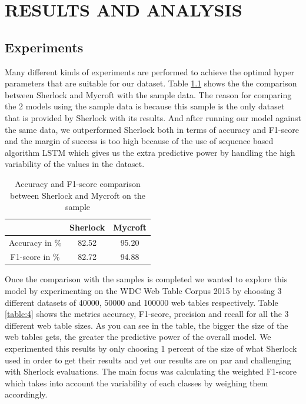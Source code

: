 \documentclass[12pt, a4paper]{report}
\theoremstyle{definition}
\numberwithin{equation}{chapter}
\numberwithin{figure}{chapter}
\numberwithin{table}{chapter}
\begin{document}
\chapter{RESULTS AND ANALYSIS}
\begin{spacing}{1.5}

\section*{Experiments}

Many different kinds of experiments are performed to achieve the optimal hyper parameters that are suitable for our dataset. Table \ref{table:3} shows the the comparison between Sherlock \cite{sherlock} and Mycroft with the sample data. The reason for comparing the 2 models using the sample data is because this sample is the only dataset that is provided by Sherlock with its results. And after running our model against the same data, we outperformed Sherlock both in terms of accuracy and F1-score and the margin of success is too high because of the use of sequence based algorithm LSTM which gives us the extra predictive power by handling the high variability of the values in the dataset.
\par
\setlength{\parskip}{1em}

\begin{table}[H]
\centering
\begin{tabular}{| c | c | c | } 
\hline
& \textbf{Sherlock} & \textbf{Mycroft} \\ [0.5ex]
\hline
Accuracy in \% & 82.52 & 95.20\\ 
F1-score in \% & 82.72 & 94.88\\ 
\hline
\end{tabular}
\caption{Accuracy and F1-score comparison between Sherlock \cite{sherlock} and Mycroft on the sample}
\label{table:3}
\end{table}

\par
\setlength{\parindent}{0em}
\setlength{\parskip}{1em}
Once the comparison with the samples is completed we wanted to explore this model by experimenting on the WDC Web Table Corpus 2015 by choosing 3 different datasets of 40000, 50000 and 100000 web tables respectively. Table \ref{table:4} shows the metrics accuracy, F1-score, precision and recall for all the 3 different web table sizes. As you can see in the table, the bigger the size of the web tables gets, the greater the predictive power of the overall model. We experimented this results by only choosing 1 percent of the size of what Sherlock used in order to get their results and yet our results are on par and challenging with Sherlock evaluations. The main focus was calculating the weighted F1-score which takes into account the variability of each classes by weighing them accordingly.
\par
\setlength{\parskip}{1em}


\end{spacing}
\end{document}
